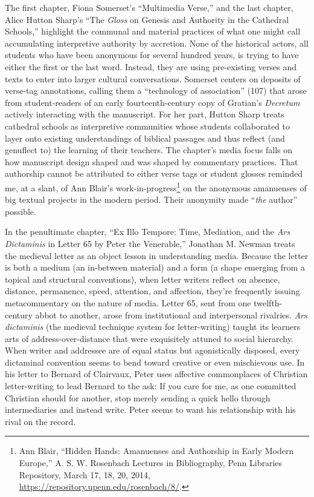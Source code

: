 \documentclass{tufte-handout}
\begin{document}
The first chapter, Fiona Somerset's ``Multimedia Verse,'' and the last
chapter, Alice Hutton Sharp's ``The \emph{Gloss} on Genesis and
Authority in the Cathedral Schools,'' highlight the communal and
material practices of what one might call accumulating interpretive
authority by accretion. None of the historical actors, all students who
have been anonymous for several hundred years, is trying to have either
the first or the last word. Instead, they are using pre-existing verses
and texts to enter into larger cultural conversations. Somerset centers
on deposits of verse-tag annotations, calling them a ``technology of
association'' (107) that arose from student-readers of an early
fourteenth-century copy of Gratian's \emph{Decretum} actively
interacting with the manuscript. For her part, Hutton Sharp treats
cathedral schools as interpretive communities whose students
collaborated to layer onto existing understandings of biblical passages
and thus reflect (and genuflect to) the learning of their teachers. The
chapter's media focus falls on how manuscript design shaped and was
shaped by commentary practices. That authorship cannot be attributed to
either verse tags or student glosses reminded me, at a slant, of Ann
Blair's work-in-progress\footnote{Ann Blair, ``Hidden Hands: Amanuenses
  and Authorship in Early Modern Europe,'' A. S. W. Rosenbach Lectures
  in Bibliography, Penn Libraries Repository, March 17, 18, 20, 2014,
  \url{https://repository.upenn.edu/rosenbach/8/}.} on the anonymous
amanuenses of big textual projects in the modern period. Their anonymity
made ``\emph{the} author'' possible.

In the penultimate chapter, ``Ex Illo Tempore: Time, Mediation, and the
\emph{Ars Dictaminis} in Letter 65 by Peter the Venerable,'' Jonathan M.
Newman treats the medieval letter as an object lesson in understanding
media. Because the letter is both a medium (an in-between material) and
a form (a shape emerging from a topical and structural conventions),
when letter writers reflect on absence, distance, permanence, speed,
attention, and affection, they're frequently issuing metacommentary on
the nature of media. Letter 65, sent from one twelfth-century abbot to
another, arose from institutional and interpersonal rivalries. \emph{Ars
dictaminis} (the medieval technique system for letter-writing) taught
its learners arts of address-over-distance that were exquisitely attuned
to social hierarchy. When writer and addressee are of equal status but
agonistically disposed, every dictaminal convention seems to bend toward
creative or even mischievous use. In his letter to Bernard of Clairvaux,
Peter uses affective commonplaces of Christian letter-writing to lead
Bernard to the ask: If you care for me, as one committed Christian
should for another, stop merely sending a quick hello through
intermediaries and instead write. Peter seems to want his relationship
with his rival on the record.
\end{document}
